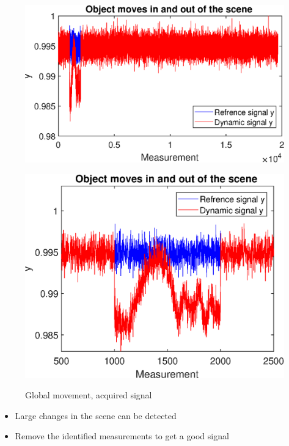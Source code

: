 \begin{figure}[H]
    \centering
\begin{minipage}[t]{0.495\textwidth}
    \includegraphics[width=1\textwidth]{result/dynamic/fly/flyby_sig.eps}
    \label{fig:fly_sig_1}
\end{minipage}
\begin{minipage}[t]{0.495\textwidth}
    \includegraphics[width = \textwidth]{result/dynamic/fly/flyby_plot_win.eps}
    \label{fig:fly_sig_2}
\end{minipage}
    \caption{Global movement, acquired signal}
    \label{fig:fly_sig}
\end{figure}

\begin{itemize}
    \item Large changes in the scene can be detected
    \item Remove the identified measurements to get a good signal 
\end{itemize}

